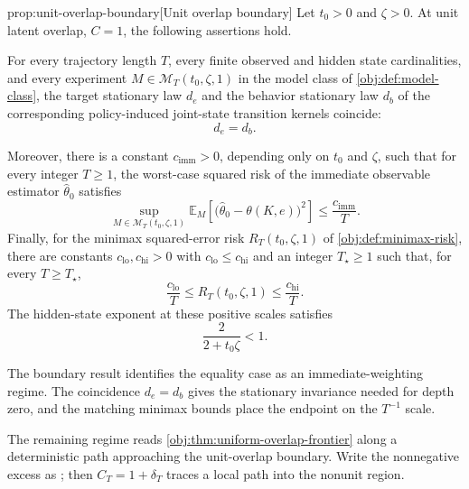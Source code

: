 \documentclass[11pt]{article}
\begin{document}
\begin{theoremv}{prop:unit-overlap-boundary}[Unit overlap boundary]
Let \(t_0>0\) and \(\zeta>0\). At unit latent overlap, \(C=1\), the following assertions hold.

For every trajectory length \(T\), every finite observed and hidden state cardinalities, and every experiment \(M\in\mathcal M_T(t_0,\zeta,1)\) in the model class of \cref{obj:def:model-class}, the target stationary law \(d_e\) and the behavior stationary law \(d_b\) of the corresponding policy-induced joint-state transition kernels coincide:
\[
d_e=d_b .
\]

Moreover, there is a constant \(c_{\mathrm{imm}}>0\), depending only on \(t_0\) and \(\zeta\), such that for every integer \(T\ge 1\), the worst-case squared risk of the immediate observable estimator \(\widehat\theta_0\) satisfies
\[
\sup_{M\in\mathcal M_T(t_0,\zeta,1)}
\mathbb E_M\!\left[\bigl(\widehat\theta_0-\theta(K,e)\bigr)^2\right]
\le \frac{c_{\mathrm{imm}}}{T}.
\]
Finally, for the minimax squared-error risk \(R_T(t_0,\zeta,1)\) of \cref{obj:def:minimax-risk}, there are constants \(c_{\mathrm{lo}},c_{\mathrm{hi}}>0\) with \(c_{\mathrm{lo}}\le c_{\mathrm{hi}}\) and an integer \(T_\star\ge 1\) such that, for every \(T\ge T_\star\),
\[
\frac{c_{\mathrm{lo}}}{T}
\le
R_T(t_0,\zeta,1)
\le
\frac{c_{\mathrm{hi}}}{T}.
\]
The hidden-state exponent at these positive scales satisfies
\[
\frac{2}{2+t_0\zeta}<1 .
\]
\end{theoremv}

The boundary result identifies the equality case as an immediate-weighting regime. The coincidence \(d_e=d_b\) gives the stationary invariance needed for depth zero, and the matching minimax bounds place the endpoint on the \(T^{-1}\) scale.

The remaining regime reads \cref{obj:thm:uniform-overlap-frontier} along a deterministic path approaching the unit-overlap boundary. Write the nonnegative excess as ; then \(C_T=1+\delta_T\) traces a local path into the nonunit region.
\end{document}
